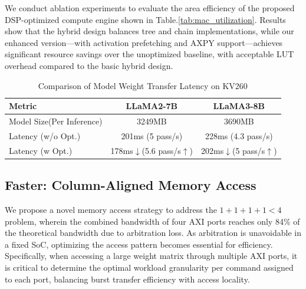 \documentclass[conference]{IEEEtran}
\begin{document}
We conduct ablation experiments to evaluate the area efficiency of the proposed DSP-optimized compute engine shown in Table.\ref{tab:mac_utilization}. Results show that the hybrid design balances tree and chain implementations, while our enhanced version—with activation prefetching and AXPY support—achieves significant resource savings over the unoptimized baseline, with acceptable LUT overhead compared to the basic hybrid design.

\begin{table}[t]
  \centering
  \caption{Comparison of Model Weight Transfer Latency on KV260}
  \begin{tabular}{lcc}
  \toprule
  \textbf{Metric} & \textbf{LLaMA2-7B} & \textbf{LLaMA3-8B}\\
  \midrule
  Model Size(Per Inference) &    3249MB     &    3690MB      \\
  Latency (w/o Opt.)        &    201ms (5 pass/s)      &    228ms (4.3 pass/s)       \\
  Latency (w Opt.)          &    178ms$\downarrow$(5.6 pass/s$\uparrow$)      &    202ms$\downarrow$(5 pass/s$\uparrow$)       \\
  \bottomrule
  \end{tabular}
  \label{tab:model_transfer}
  \end{table}

\subsection{Faster: Column-Aligned Memory Access}

We propose a novel memory access strategy to address the $1+1+1+1<4$ problem, wherein the combined bandwidth of four AXI ports reaches only 84\% of the theoretical bandwidth\cite{li2025pushing} due to arbitration loss.
As arbitration is unavoidable in a fixed SoC, optimizing the access pattern becomes essential for efficiency. Specifically, when accessing a large weight matrix through multiple AXI ports, it is critical to determine the optimal workload granularity per command assigned to each port, balancing burst transfer efficiency with access locality.
\end{document}
